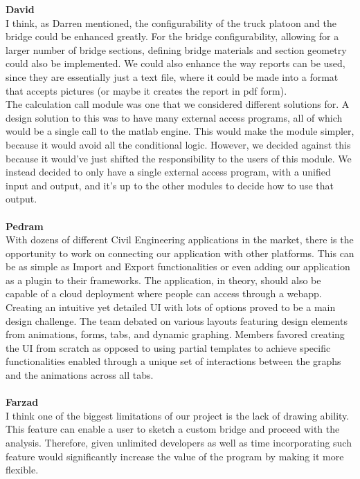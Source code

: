 \documentclass[12pt, titlepage]{article}
\begin{document}
\noindent\textbf{David}\\
I think, as Darren mentioned, the configurability of the truck platoon and the bridge could be enhanced greatly. For 
the bridge configurability, allowing for a larger number of bridge sections, defining bridge materials and section 
geometry could also be implemented. We could also enhance the way reports can be used, since they are essentially just
a text file, where it could be made into a format that accepts pictures (or maybe it creates the report in pdf form).\\

The calculation call module was one that we considered different solutions for. A design solution to this was to have
many external access programs, all of which would be a single call to the matlab engine. This would make the module
simpler, because it would avoid all the conditional logic. However, we decided against this because it would've just
shifted the responsibility to the users of this module. We instead decided to only have a single external access
program, with a unified input and output, and it's up to the other modules to decide how to use that output.\\\\

\noindent\textbf{Pedram}\\
With dozens of different Civil Engineering applications in the market, there is the opportunity to work on connecting our application with other platforms. This can be as simple as Import and Export functionalities or even adding our application as a plugin to their frameworks. The application, in theory, should also be capable of a cloud deployment where people can access through a webapp.\\

Creating an intuitive yet detailed UI with lots of options proved to be a main design challenge. The team debated on various layouts featuring design elements from animations, forms, tabs, and dynamic graphing. Members favored creating the UI from scratch as opposed to using partial templates to achieve specific functionalities enabled through a unique set of interactions between the graphs and the animations across all tabs. \\\\

\noindent\textbf{Farzad}\\
I think one of the biggest limitations of our project is the lack of drawing ability. This feature can enable a user to sketch a custom bridge and proceed with the analysis. Therefore, given unlimited developers as well as time incorporating such feature would significantly increase the value of the program by making it more flexible.\\
\end{document}
